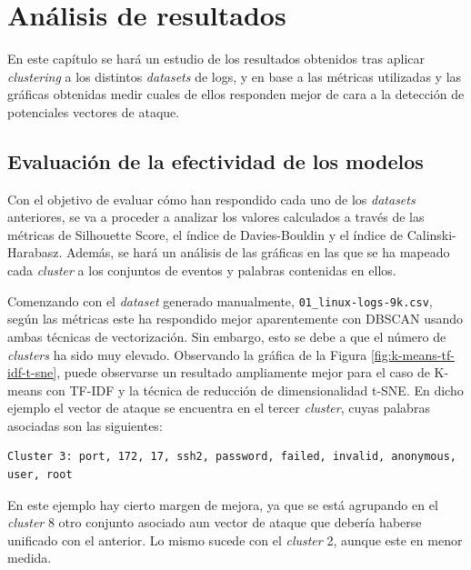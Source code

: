 \chapter{Análisis de resultados}

En este capítulo se hará un estudio de los resultados obtenidos tras aplicar \textit{clustering} a los distintos \textit{datasets} de logs, y en base a las métricas utilizadas y las gráficas obtenidas medir cuales de ellos responden mejor de cara a la detección de potenciales vectores de ataque.


\section{Evaluación de la efectividad de los modelos}

Con el objetivo de evaluar cómo han respondido cada uno de los \textit{datasets} anteriores, se va a proceder a analizar los valores calculados a través de las métricas de Silhouette Score, el índice de Davies-Bouldin y el índice de Calinski-Harabasz. Además, se hará un análisis de las gráficas en las que se ha mapeado cada \textit{cluster} a los conjuntos de eventos y palabras contenidas en ellos.

Comenzando con el \textit{dataset} generado manualmente, \texttt{01\_linux-logs-9k.csv}, según las métricas este ha respondido mejor aparentemente con \gls{DBSCAN} usando ambas técnicas de vectorización. Sin embargo, esto se debe a que el número de \textit{clusters} ha sido muy elevado. Observando la gráfica de la Figura \ref{fig:k-means-tf-idf-t-sne}, puede observarse un resultado ampliamente mejor para el caso de K-means con \gls{TF}-\gls{IDF} y la técnica de reducción de dimensionalidad \gls{t-SNE}. En dicho ejemplo el vector de ataque se encuentra en el tercer \textit{cluster}, cuyas palabras asociadas son las siguientes:

\begin{center}
    \begin{mdframed}
    \footnotesize
            \begin{verbatim}
Cluster 3: port, 172, 17, ssh2, password, failed, invalid, anonymous, 
user, root
            \end{verbatim}
    \end{mdframed}
\end{center}


En este ejemplo hay cierto margen de mejora, ya que se está agrupando en el \textit{cluster} 8 otro conjunto asociado aun vector de ataque que debería haberse unificado con el anterior. Lo mismo sucede con el \textit{cluster} 2, aunque este en menor medida.

